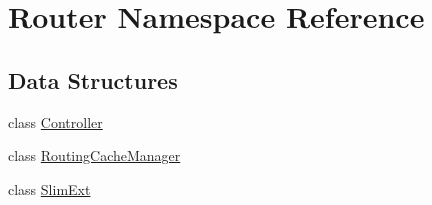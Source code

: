 \hypertarget{namespace_router}{\section{Router Namespace Reference}
\label{namespace_router}
}
\subsection*{Data Structures}
\begin{DoxyCompactItemize}
\item 
class \hyperlink{class_router_1_1_controller}{Controller}
\item 
class \hyperlink{class_router_1_1_routing_cache_manager}{Routing\-Cache\-Manager}
\item 
class \hyperlink{class_router_1_1_slim_ext}{Slim\-Ext}
\end{DoxyCompactItemize}
